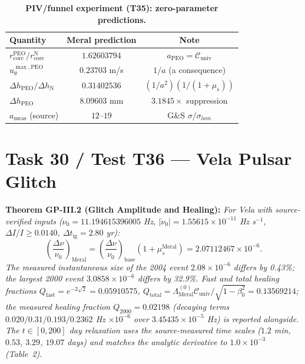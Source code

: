 \documentclass[12pt,a4paper]{article}
\begin{document}
\begin{table}[!htbp]
\centering\footnotesize
\setlength{\tabcolsep}{3pt}
\caption{\textbf{PIV/funnel experiment (T35): zero-parameter predictions.}}
\label{tab:piv}
\vspace{0.1cm}
\begin{tabular}{@{}l|c|c@{}}
\toprule
Quantity & Meral prediction & Note \\
\midrule
$r_{\mathrm{core}}^{\mathrm{PEO}}/r_{\mathrm{core}}^{\mathrm{N}}$ & $1.62603794$ & $a_{\mathrm{PEO}}=\mathcal{C}_{\mathrm{univ}}$ \\
$u_\theta^{\max,\mathrm{PEO}}$ & $0.23703$ m/s & $1/a$ (a consequence) \\
$\Delta h_{\mathrm{PEO}}/\Delta h_{\mathrm{N}}$ & $0.31402536$ & $(1/a^2)(1/(1+\mu_s))$ \\
$\Delta h_{\mathrm{PEO}}$ & $8.09603$ mm & $3.1845\times$ suppression \\
$a_{\mathrm{meas}}$ (source) & $12$--$19$ & G\&S $\sigma/\sigma_{lam}$ \\
\bottomrule
\end{tabular}
\end{table}

\section{Task 30 / Test T36 --- Vela Pulsar Glitch}

\textbf{Theorem GP-III.2 (Glitch Amplitude and Healing):} \textit{For Vela with
source-verified inputs ($\nu_0=11.194615396005$ Hz,
$|\dot\nu_0|=1.55615\times 10^{-11}$ Hz s$^{-1}$,
$\Delta I/I \ge 0.0140$, $\Delta t_{\mathrm{ig}}=2.80$ yr):}
\begin{equation}
\boxed{\left(\frac{\Delta\nu}{\nu_0}\right)_{\mathrm{Meral}}
=\left(\frac{\Delta\nu}{\nu_0}\right)_{\mathrm{base}}
(1+\mu_s^{\mathrm{Meral}})=2.07112467\times 10^{-6}.}
\end{equation}
\textit{The measured instantaneous size of the 2004 event
$2.08\times 10^{-6}$ differs by 0.43\%; the largest 2000 event
$3.0858\times 10^{-6}$ differs by 32.9\%. Fast and total healing fractions
$Q_{\mathrm{fast}}=e^{-2\sqrt{2}}=0.05910575$,
$Q_{\mathrm{total}}=\Lambda_{\mathrm{Meral}}^{(0)}\mathcal{C}_{\mathrm{univ}}/
\sqrt{1-\beta_0^2}=0.13569214$; the measured healing fraction
$Q_{2000}=0.02198$ (decaying terms $0.020/0.31/0.193/0.2362$ Hz
$\times 10^{-6}$ over $3.45435\times 10^{-5}$ Hz) is reported alongside.
The $t\in[0,200]$ day relaxation uses the source-measured time scales
($1.2$ min, $0.53$, $3.29$, $19.07$ days) and matches the analytic
derivative to $1.0\times 10^{-3}$ (Table~2).}
\end{document}
